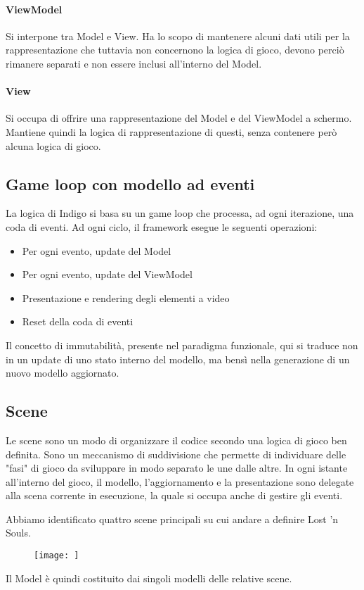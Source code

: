 \paragraph{ViewModel}
Si interpone tra Model e View. Ha lo scopo di mantenere alcuni dati utili per la rappresentazione che tuttavia non concernono la logica di gioco, devono perciò rimanere separati e non essere inclusi all'interno del Model.

\paragraph{View}
Si occupa di offrire una rappresentazione del Model e del ViewModel a schermo. Mantiene quindi la logica di rappresentazione di questi, senza contenere però alcuna logica di gioco.

\subsection{Game loop con modello ad eventi}
La logica di Indigo si basa su un game loop che processa, ad ogni iterazione, una coda di eventi. 
Ad ogni ciclo, il framework esegue le seguenti operazioni:
\begin{itemize}
    \item Per ogni evento, update del Model
    \item Per ogni evento, update del ViewModel
    \item Presentazione e rendering degli elementi a video
    \item Reset della coda di eventi
\end{itemize}

Il concetto di immutabilità, presente nel paradigma funzionale, qui si traduce non in un update di uno stato interno del modello, ma bensì nella generazione di un nuovo modello aggiornato. 

\subsection{Scene}
Le scene sono un modo di organizzare il codice secondo una logica di gioco ben definita. Sono un meccanismo di suddivisione che permette di individuare delle "fasi" di gioco da sviluppare in modo separato le une dalle altre.
In ogni istante all'interno del gioco, il modello, l'aggiornamento e la presentazione sono delegate alla scena corrente in esecuzione, la quale si occupa anche di gestire gli eventi. 

Abbiamo identificato quattro scene principali su cui andare a definire Lost 'n Souls. 


\begin{figure}[!hbt]
    \centering
    \texttt{[image: ]}
    \caption{} 
\end{figure}

Il Model è quindi costituito dai singoli modelli delle relative scene.


